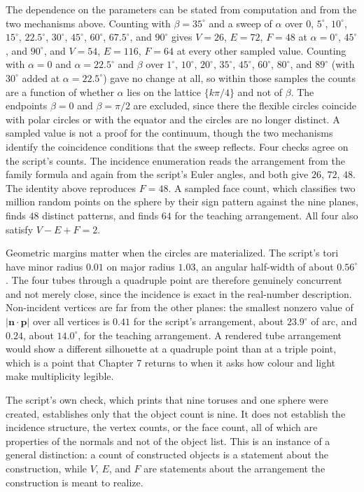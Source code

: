 The dependence on the parameters can be stated from computation and from the two mechanisms above. Counting with $\beta=35^\circ$ and a sweep of $\alpha$ over $0$, $5^\circ$, $10^\circ$, $15^\circ$, $22.5^\circ$, $30^\circ$, $45^\circ$, $60^\circ$, $67.5^\circ$, and $90^\circ$ gives $V=26$, $E=72$, $F=48$ at $\alpha=0^\circ$, $45^\circ$, and $90^\circ$, and $V=54$, $E=116$, $F=64$ at every other sampled value. Counting with $\alpha=0$ and $\alpha=22.5^\circ$ and $\beta$ over $1^\circ$, $10^\circ$, $20^\circ$, $35^\circ$, $45^\circ$, $60^\circ$, $80^\circ$, and $89^\circ$ (with $30^\circ$ added at $\alpha=22.5^\circ$) gave no change at all, so within those samples the counts are a function of whether $\alpha$ lies on the lattice $\{k\pi/4\}$ and not of $\beta$. The endpoints $\beta=0$ and $\beta=\pi/2$ are excluded, since there the flexible circles coincide with polar circles or with the equator and the circles are no longer distinct. A sampled value is not a proof for the continuum, though the two mechanisms identify the coincidence conditions that the sweep reflects. Four checks agree on the script's counts. The incidence enumeration reads the arrangement from the family formula and again from the script's Euler angles, and both give $26$, $72$, $48$. The identity above reproduces $F=48$. A sampled face count, which classifies two million random points on the sphere by their sign pattern against the nine planes, finds $48$ distinct patterns, and finds $64$ for the teaching arrangement. All four also satisfy $V-E+F=2$.

Geometric margins matter when the circles are materialized. The script's tori have minor radius $0.01$ on major radius $1.03$, an angular half-width of about $0.56^\circ$. The four tubes through a quadruple point are therefore genuinely concurrent and not merely close, since the incidence is exact in the real-number description. Non-incident vertices are far from the other planes: the smallest nonzero value of $|\mathbf n\cdot\mathbf p|$ over all vertices is $0.41$ for the script's arrangement, about $23.9^\circ$ of arc, and $0.24$, about $14.0^\circ$, for the teaching arrangement. A rendered tube arrangement would show a different silhouette at a quadruple point than at a triple point, which is a point that Chapter 7 returns to when it asks how colour and light make multiplicity legible.

The script's own check, which prints that nine toruses and one sphere were created, establishes only that the object count is nine. It does not establish the incidence structure, the vertex counts, or the face count, all of which are properties of the normals and not of the object list. This is an instance of a general distinction: a count of constructed objects is a statement about the construction, while $V$, $E$, and $F$ are statements about the arrangement the construction is meant to realize.

